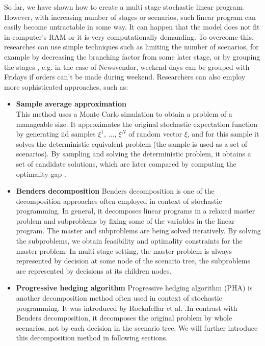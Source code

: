 \documentclass[11pt,a4paper]{article}
\begin{document}
So far, we have shown how to create a multi stage stochastic linear program. However, with increasing number of stages or scenarios, such linear program can easily become untractable in some way. It can happen that the model does not fit in computer's RAM or it is very computationally demanding. To overcome this, researches can use simple techniques such as limiting the number of scenarios, for example by decreasing the branching factor from some later stage, or by grouping the stages \cite{sp_tut}, e.g. in the case of Newsvendor, weekend days can be grouped with Fridays if orders can't be made during weekend. Researchers can also employ more sophisticated approaches, such as:
\begin{itemize}
\item \textbf{Sample average approximation} \\
This method uses a Monte Carlo simulation to obtain a problem of a manageable size. It approximates the original stochastic expectation function by generating iid samples $\xi^1$, ..., $\xi^N$ of random vector $\xi$, and for this sample it solves the deterministic equivalent problem (the sample is used as a set of scenarios). By sampling and solving the deterministic problem, it obtains a set of candidate solutions, which are later compared by computing the optimality gap \cite{sp_book}.
\item \textbf{Benders decomposition}
Benders decomposition \cite{benders1962partitioning} is one of the decomposition approaches often employed in context of stochastic programming. In general, it decomposes linear programs in a relaxed master problem and subproblems by fixing some of the variables in the linear program. The master and subproblems are being solved iteratively. By solving the subproblems, we obtain feasibility and optimality constraints for the master problem. In multi stage setting, the master problem is always represented by decision at some node of the scenario tree, the subproblems are represented by decisions at its children nodes. 
\item \textbf{Progressive hedging algorithm}
Progressive hedging algorithm (PHA) is another decomposition method often used in context of stochastic programming. It was introduced by Rockafellar et al. \cite{rockafellar1991scenarios}.In contrast with Benders decomposition, it decomposes the original problem by whole scenarios, not by each decision in the scenario tree. We will further introduce this decomposition method in following sections.

\end{itemize}
\newpage
\end{document}
